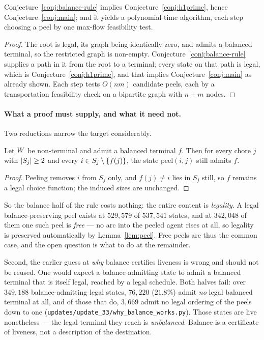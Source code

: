 \begin{proposition}
\label{prop:balance-rule-implies}
Conjecture~\ref{conj:balance-rule} implies Conjecture~\ref{conj:h1prime}, hence
Conjecture~\ref{conj:main}; and it yields a polynomial-time algorithm, each step
choosing a peel by one max-flow feasibility test.
\end{proposition}

\begin{proof}
The root is legal, its graph being identically zero, and admits a balanced
terminal, so the restricted graph is non-empty.
Conjecture~\ref{conj:balance-rule} supplies a path in it from the root to a
terminal; every state on that path is legal, which is
Conjecture~\ref{conj:h1prime}, and that implies Conjecture~\ref{conj:main} as
already shown. Each step tests $O(nm)$ candidate peels, each by a transportation
feasibility check on a bipartite graph with $n + m$ nodes.
\end{proof}

\paragraph{What a proof must supply, and what it need not.} Two reductions narrow
the target considerably.

\begin{lemma}
\label{lem:balance-free}
Let $W$ be non-terminal and admit a balanced terminal $f$. Then for
every chore $j$ with $\left\lvert S_j\right\rvert \ge 2$ and every $i \in S_j \setminus
\left\{f(j)\right\}$, the state $\mathrm{peel}(i,j)$ still admits $f$.
\end{lemma}

\begin{proof}
Peeling removes $i$ from $S_j$ only, and $f(j) \ne i$ lies in $S_j$ still, so $f$
remains a legal choice function; the induced sizes are unchanged.
\end{proof}

So the balance half of the rule costs nothing: the entire content is
\emph{legality}. A legal balance-preserving peel exists at $529{,}579$ of
$537{,}541$ states, and at $342{,}048$ of them one such peel is \emph{free} ---
no arc into the peeled agent rises at all, so legality is preserved
automatically by Lemma~\ref{lem:peel}. Free peels are thus the common case, and
the open question is what to do at the remainder.

Second, the earlier guess at \emph{why} balance certifies liveness is wrong and
should not be reused. One would expect a balance-admitting state to admit a
balanced terminal that is itself legal, reached by a legal schedule. Both halves
fail: over $349{,}188$ balance-admitting legal states, $76{,}220$ ($21.8\%$)
admit \emph{no} legal balanced terminal at all, and of those that do, $3{,}669$
admit no legal ordering of the peels down to one
(\texttt{updates/update\_33/why\_balance\_works.py}). Those states are live nonetheless
--- the legal terminal they reach is \emph{unbalanced}. Balance is a certificate
of liveness, not a description of the destination.

